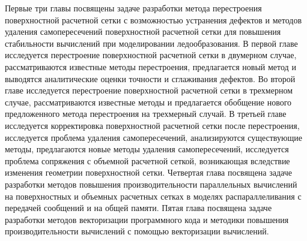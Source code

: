 Первые три главы посвящены задаче разработки метода перестроения поверхностной расчетной сетки с возможностью устранения дефектов и методов удаления самопересечений поверхностной расчетной сетки для повышения стабильности вычислений при моделировании ледообразования.
В первой главе исследуется перестроение поверхностной расчетной сетки в двумерном случае, рассматриваются известные методы перестроения, предлагается новый метод и выводятся аналитические оценки точности и сглаживания дефектов.
Во второй главе исследуется перестроение поверхностной расчетной сетки в трехмерном случае, рассматриваются известные методы и предлагается обобщение нового предложенного метода перестроения на трехмерный случай.
В третьей главе исследуется корректировка поверхностной расчетной сетки после перестроения, исследуется проблема удаления самопересечений, анализируются существующие методы, предлагаются новые методы удаления самопересечений, исследуется проблема сопряжения с объемной расчетной сеткой, возникающая вследствие изменения геометрии поверхностной сетки.
Четвертая глава посвящена задаче разработки методов повышения производительности параллельных вычислений на поверхностных и объемных расчетных сетках в моделях распараллеливания с передачей сообщений и на общей памяти.
Пятая глава посвящена задаче разработки методов векторизации программного кода и методики повышения производительности вычислений с помощью векторизации вычислений.